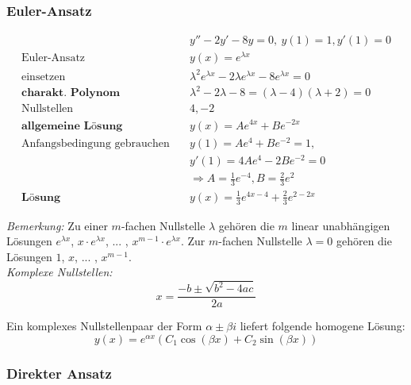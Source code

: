 \subsubsection{Euler-Ansatz}

\begin{equation*}
\begin{split}
	& y'' - 2y' - 8y = 0,\ y(1) = 1, y'(1) = 0 \\
	\text{Euler-Ansatz}\quad & y(x) = e^{\lambda x} \\
	\text{einsetzen}\quad & \lambda^2 e^{\lambda x} - 2\lambda e^{\lambda x} - 8e^{\lambda x} = 0 \\
	\textbf{charakt. Polynom}\quad & \lambda^2 - 2\lambda - 8 = (\lambda - 4)(\lambda + 2) = 0 \\
	\text{Nullstellen}\quad & 4, -2 \\
	\textbf{allgemeine L{\"o}sung}\quad & y(x) = Ae^{4x} + Be^{-2x} \\
	\text{Anfangsbedingung gebrauchen}\quad & y(1) = Ae^4 + Be^{-2} =1,\\ &y'(1) = 4Ae^4 - 2Be^{-2} = 0 \\
											& \Rightarrow A = \frac{1}{3}e^{-4}, B = \frac{2}{3}e^2 \\
	\textbf{L{\"o}sung}\quad & y(x) = \frac{1}{3}e^{4x-4} + \frac{2}{3}e^{2-2x}
\end{split}
\end{equation*}

\emph{Bemerkung:} Zu einer $m$-fachen Nullstelle $\lambda$ geh{\"o}ren die $m$ linear unabh{\"a}ngigen L{\"o}sungen $e^{\lambda x}$, $x\cdot e^{\lambda x}$, ... , $x^{m-1}\cdot e^{\lambda x}$. Zur $m$-fachen Nullstelle $\lambda = 0$ geh{\"o}ren die L{\"o}sungen $1$, $x$, ... , $x^{m-1}$. \\
 
\emph{Komplexe Nullstellen:} \\

\begin{equation*}
	x = \frac{-b \pm \sqrt{b^2-4ac}}{2a}
\end{equation*}

Ein komplexes Nullstellenpaar der Form $\alpha \pm \beta i$ liefert folgende homogene L{\"o}sung:
\begin{equation*}
	y(x)=e^{\alpha x}(C_1\cos(\beta x) + C_2\sin(\beta x))
\end{equation*}



\subsubsection{Direkter Ansatz}

